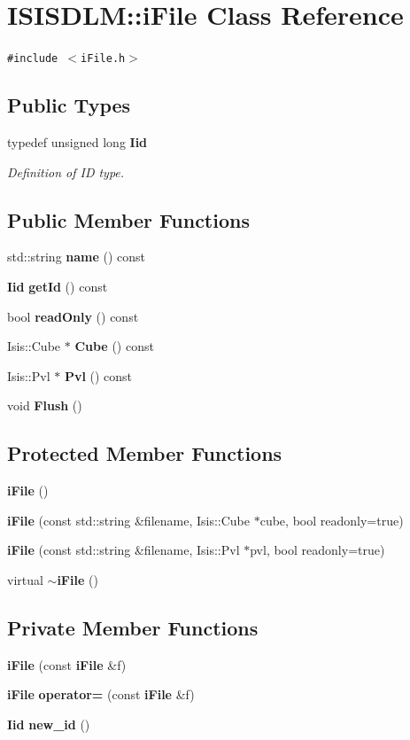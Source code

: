 \section{ISISDLM::i\-File Class Reference}
\label{classISISDLM_1_1iFile}
{\tt \#include $<$i\-File.h$>$}

\subsection*{Public Types}
\begin{CompactItemize}
\item 
typedef unsigned long {\bf Iid}
\begin{CompactList}\small\item\em Definition of ID type. \item\end{CompactList}\end{CompactItemize}
\subsection*{Public Member Functions}
\begin{CompactItemize}
\item 
std::string {\bf name} () const
\item 
{\bf Iid} {\bf get\-Id} () const
\item 
bool {\bf read\-Only} () const
\item 
Isis::Cube $\ast$ {\bf Cube} () const
\item 
Isis::Pvl $\ast$ {\bf Pvl} () const
\item 
void {\bf Flush} ()
\end{CompactItemize}
\subsection*{Protected Member Functions}
\begin{CompactItemize}
\item 
{\bf i\-File} ()
\item 
{\bf i\-File} (const std::string \&filename, Isis::Cube $\ast$cube, bool readonly=true)
\item 
{\bf i\-File} (const std::string \&filename, Isis::Pvl $\ast$pvl, bool readonly=true)
\item 
virtual {\bf $\sim$i\-File} ()
\end{CompactItemize}
\subsection*{Private Member Functions}
\begin{CompactItemize}
\item 
{\bf i\-File} (const {\bf i\-File} \&f)
\item 
{\bf i\-File} {\bf operator=} (const {\bf i\-File} \&f)
\item 
{\bf Iid} {\bf new\_\-id} ()
\end{CompactItemize}
